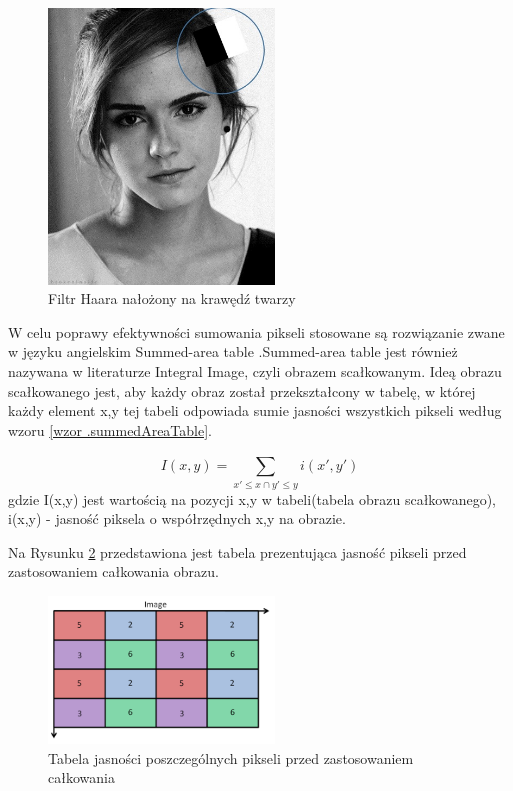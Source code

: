 \documentclass[a4paper,twoside,12pt]{book}
\begin{document}
    \begin{figure}
        \centering
        \includegraphics[width=6cm]{Obrazy/haarEmmaWatson.jpg}
        \caption{Filtr Haara nałożony na krawędź twarzy \cite{haar}}
        \label{fig.haarEmmaWatson}
    \end{figure}

    W celu poprawy efektywności sumowania pikseli stosowane są
    rozwiązanie zwane w języku angielskim Summed-area table \cite{violaJonesRealTimeOb}.Summed-area table jest również
    nazywana w literaturze Integral Image, czyli obrazem scałkowanym.
    Ideą obrazu scałkowanego jest,
    aby każdy obraz
    został
    przekształcony w
    tabelę, w której każdy element x,y tej tabeli odpowiada sumie jasności wszystkich pikseli według wzoru \ref{wzor
    .summedAreaTable}.

    \large
    \begin{equation}
        I(x,y) = \sum_{{x}'\leq x \cap {y}'\leq y}^{} i({x}',{y}')
        \label{wzor.summedAreaTable}
    \end{equation}
    \normalsize
    gdzie I(x,y) jest wartością na pozycji x,y w tabeli(tabela obrazu scałkowanego), i(x,y) - jasność piksela o
    współrzędnych x,y na obrazie.

    Na Rysunku \ref{fig.przedCalkowaniem} przedstawiona jest tabela prezentująca jasność pikseli przed
    zastosowaniem całkowania obrazu.
    \begin{figure}
        \centering
        \includegraphics[width=6cm]{Obrazy/przedCalkowaniem.jpg}
        \caption{Tabela jasności poszczególnych pikseli przed zastosowaniem całkowania \cite{integralImages}}
        \label{fig.przedCalkowaniem}
    \end{figure}
\end{document}

